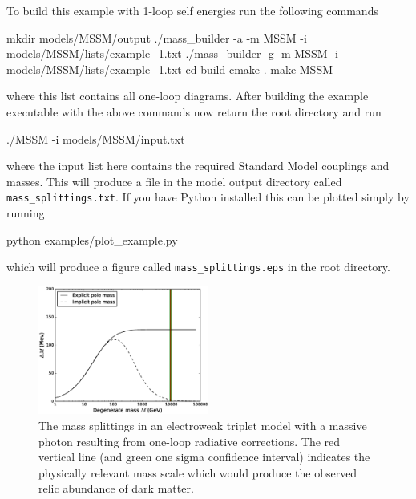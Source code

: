 To build this example with 1-loop self energies run the following commands
\begin{lstterm}
mkdir models/MSSM/output
./mass_builder -a -m MSSM -i models/MSSM/lists/example_1.txt
./mass_builder -g -m MSSM -i models/MSSM/lists/example_1.txt
cd build
cmake .
make MSSM
\end{lstterm}
where this list contains all one-loop diagrams.  After building the example executable with the above commands now return the root directory and run
\begin{lstterm}
./MSSM -i models/MSSM/input.txt
\end{lstterm}
where the input list here contains the required Standard Model couplings and masses.  This will produce a file in the model output directory called \lstinline{mass_splittings.txt}.  If you have Python installed this can be plotted simply by running
\begin{lstterm}
python examples/plot_example.py
\end{lstterm}
which will produce a figure called \lstinline{mass_splittings.eps} in the \mb root directory.
\begin{figure}
\centering
\includegraphics[width=0.5\textwidth]{mass_splittings.eps}
\caption{The mass splittings in an electroweak triplet model with a massive photon resulting from one-loop radiative corrections.  The red vertical line (and green one sigma confidence interval) indicates the physically relevant mass scale which would produce the observed relic abundance of dark matter.}\label{fig:1_loop}
\end{figure}

